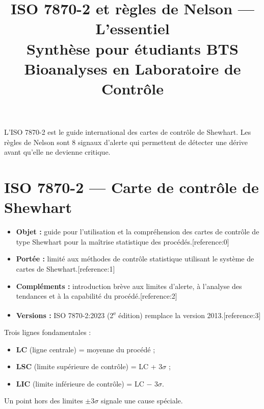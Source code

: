 \documentclass[11pt,a4paper]{article}
\title{\textcolor{primary}{\textbf{ISO 7870-2 et règles de Nelson — L'essentiel}}\\
\large Synthèse pour étudiants BTS Bioanalyses en Laboratoire de Contrôle}
\author{}
\date{}
\begin{document}
\maketitle

\vspace{-0.5cm}

\begin{idee}[title={\faLightbulb\quad En une phrase}]
L'ISO 7870-2 est le guide international des cartes de contrôle de Shewhart. Les règles de Nelson sont 8 signaux d'alerte qui permettent de détecter une dérive avant qu'elle ne devienne critique.
\end{idee}

\section*{\faBullseye\quad ISO 7870-2 — Carte de contrôle de Shewhart}

\begin{itemize}[leftmargin=1.2cm, itemsep=2pt]
    \item[\textcolor{primary}{\faCheck}] \textbf{Objet :} guide pour l'utilisation et la compréhension des cartes de contrôle de type Shewhart pour la maîtrise statistique des procédés.[reference:0]
    \item[\textcolor{primary}{\faCheck}] \textbf{Portée :} limité aux méthodes de contrôle statistique utilisant le système de cartes de Shewhart.[reference:1]
    \item[\textcolor{primary}{\faCheck}] \textbf{Compléments :} introduction brève aux limites d'alerte, à l'analyse des tendances et à la capabilité du procédé.[reference:2]
    \item[\textcolor{primary}{\faCheck}] \textbf{Versions :} ISO 7870-2:2023 (2\textsuperscript{e} édition) remplace la version 2013.[reference:3]
\end{itemize}

\vspace{0.2cm}

\begin{retenir}[title={\faChartLine\quad Structure d'une carte de Shewhart}]
Trois lignes fondamentales :
\begin{itemize}[leftmargin=*]
    \item \textbf{LC} (ligne centrale) = moyenne du procédé ;
    \item \textbf{LSC} (limite supérieure de contrôle) = LC + \(3\sigma\) ;
    \item \textbf{LIC} (limite inférieure de contrôle) = LC \(-\) \(3\sigma\).
\end{itemize}
Un point hors des limites \(\pm 3\sigma\) signale une cause spéciale.
\end{retenir}
\end{document}
